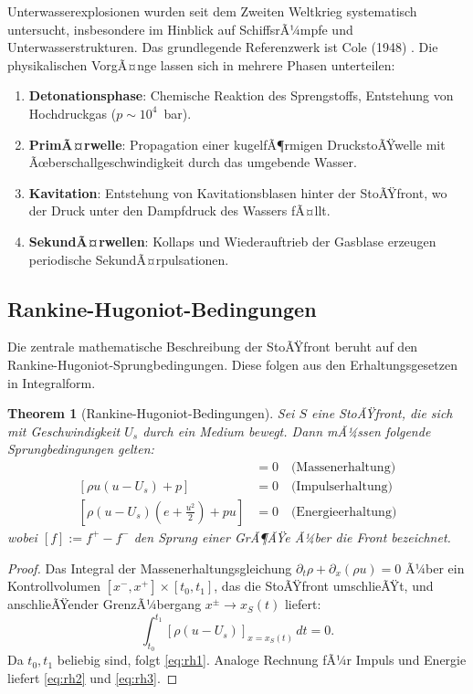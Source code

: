 ﻿\documentclass[12pt,a4paper]{article}
\newtheorem{theorem}{Theorem}[section]
\theoremstyle{definition}
\theoremstyle{remark}
\begin{document}
Unterwasserexplosionen wurden seit dem Zweiten Weltkrieg systematisch untersucht, insbesondere im Hinblick auf SchiffsrÃ¼mpfe und Unterwasserstrukturen. Das grundlegende Referenzwerk ist Cole (1948) \cite{cole1948}. Die physikalischen VorgÃ¤nge lassen sich in mehrere Phasen unterteilen:

\begin{enumerate}[label=\textbf{\arabic*.}]
\item \textbf{Detonationsphase}: Chemische Reaktion des Sprengstoffs, Entstehung von Hochdruckgas ($p \sim 10^4$~bar).
\item \textbf{PrimÃ¤rwelle}: Propagation einer kugelfÃ¶rmigen DruckstoÃŸwelle mit Ãœberschall\-ge\-schwindigkeit durch das umgebende Wasser.
\item \textbf{Kavitation}: Entstehung von Kavitationsblasen hinter der StoÃŸfront, wo der Druck unter den Dampfdruck des Wassers fÃ¤llt.
\item \textbf{SekundÃ¤rwellen}: Kollaps und Wiederauftrieb der Gasblase erzeugen periodische SekundÃ¤rpulsationen.
\end{enumerate}

\subsection{Rankine-Hugoniot-Bedingungen}

Die zentrale mathematische Beschreibung der StoÃŸfront beruht auf den Rankine-Hugoniot-Sprungbedingungen. Diese folgen aus den Erhaltungsgesetzen in Integralform.

\begin{theorem}[Rankine-Hugoniot-Bedingungen]
\label{thm:rankine}
Sei $S$ eine StoÃŸfront, die sich mit Geschwindigkeit $U_s$ durch ein Medium bewegt. Dann mÃ¼ssen folgende Sprungbedingungen gelten:
\begin{align}
[\rho(u - U_s)] &= 0 \quad \text{(Massenerhaltung)}\label{eq:rh1}\\
[\rho u(u - U_s) + p] &= 0 \quad \text{(Impulserhaltung)}\label{eq:rh2}\\
\left[\rho(u-U_s)\left(e + \frac{u^2}{2}\right) + pu\right] &= 0 \quad \text{(Energieerhaltung)}\label{eq:rh3}
\end{align}
wobei $[f] := f^+ - f^-$ den Sprung einer GrÃ¶ÃŸe Ã¼ber die Front bezeichnet.
\end{theorem}
\begin{proof}
Das Integral der Massenerhaltungsgleichung $\partial_t \rho + \partial_x(\rho u) = 0$ Ã¼ber ein Kontrollvolumen $[x^-,x^+] \times [t_0, t_1]$, das die StoÃŸfront umschlieÃŸt, und anschlieÃŸender GrenzÃ¼bergang $x^\pm \to x_S(t)$ liefert:
\[
\int_{t_0}^{t_1} \left[\rho(u - U_s)\right]_{x=x_S(t)}\,dt = 0.
\]
Da $t_0, t_1$ beliebig sind, folgt \eqref{eq:rh1}. Analoge Rechnung fÃ¼r Impuls und Energie liefert \eqref{eq:rh2} und \eqref{eq:rh3}. 
\end{proof}
\end{document}
